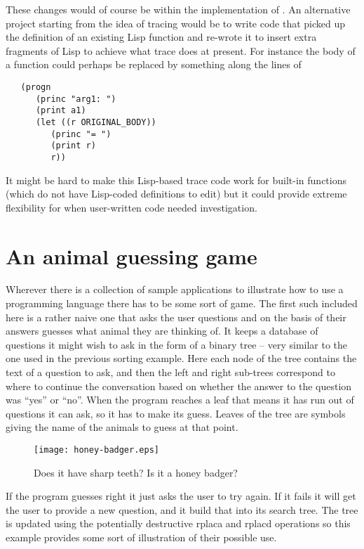These changes would of course be within the implementation of \vsl.
An alternative project starting from the idea of tracing would be to
write code that picked up the definition of an existing
Lisp function and re-wrote it to insert extra fragments of Lisp
to achieve what {\tx trace} does at present. For instance the body
of a function could perhaps be replaced by something along the lines of
{\small\begin{verbatim}
   (progn
      (princ "arg1: ")
      (print a1)
      (let ((r ORIGINAL_BODY))
         (princ "= ")
         (print r)
         r))
\end{verbatim}}

It might be hard to make this Lisp-based trace code work for built-in
functions (which do not have Lisp-coded definitions to edit) but it could
provide extreme flexibility for when user-written code needed investigation.

\section{An animal guessing game}
Wherever there is a collection of sample applications to illustrate how to
use a programming language there has to be some sort of game. The first such
included here is a rather naive one that asks the user questions and on the
basis of their answers guesses what animal they are thinking of. It keeps
a database of questions it might wish to ask in the form of a binary tree --
very similar to the one used in the previous sorting example. Here each node
of the tree contains the text of a question to ask, and then the left and right
sub-trees correspond to where to continue the conversation based on whether the
answer to the question was ``yes'' or ``no''. When the program reaches a leaf
that means it has run out of questions it can ask, so it has to make its guess.
Leaves of the tree are symbols giving the name of the animals to guess at that
point.
\begin{figure}
\begin{center}
\texttt{[image: honey-badger.eps]}
\end{center}
\caption{Does it have sharp teeth? Is it a honey badger?}
\end{figure}

If the program guesses right it just asks the user to try again. If it fails
it will get the user to provide a new question, and it build that into its
search tree. The tree is updated using the potentially destructive
{\tx rplaca} and {\tx rplacd} operations so this example provides some sort
of illustration of their possible use.

